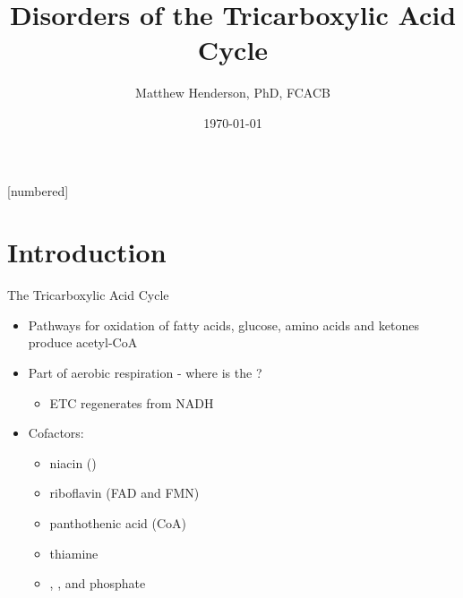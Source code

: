 \documentclass[presentation, smaller]{beamer}
\author{Matthew Henderson, PhD, FCACB}
\date{\today}
\title{Disorders of the Tricarboxylic Acid Cycle}
\institute[NSO]{Newborn Screening Ontario | The University of Ottawa}
\begin{document}
\maketitle


\vspace{220pt}
\beamertemplatenavigationsymbolsempty
{}[numbered]

\section{Introduction}
\label{sec:orgafc44ed}

\begin{frame}[label={sec:orgdaa0a47}]{The Tricarboxylic Acid Cycle}
\begin{itemize}
\item Pathways for oxidation of fatty acids, glucose, amino acids and ketones produce acetyl-CoA
\end{itemize}
\centering
{}
\begin{itemize}
\item Part of aerobic respiration - where is the ?
\begin{itemize}
\item ETC regenerates  from NADH
\end{itemize}
\item Cofactors:
\begin{itemize}
\item niacin ()
\item riboflavin (FAD and FMN)
\item panthothenic acid (CoA)
\item thiamine
\item {}, ,  and phosphate
\end{itemize}
\end{itemize}
\end{frame}
\end{document}
